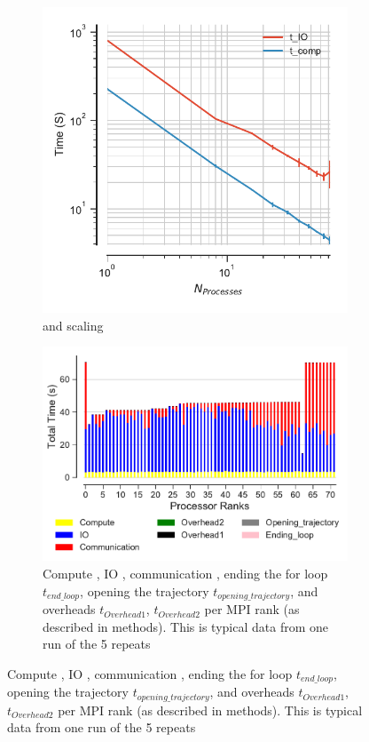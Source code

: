 \begin{figure}[ht!]
\begin{subfigure}{.4\textwidth}
  \includegraphics[width=\linewidth]{figures/main-RMSD-time_comp_IO_comparison.pdf}
\caption{\tcomp and \tIO scaling}
\label{fig:ScalingComputeIO}
\end{subfigure}
\hfill
\begin{subfigure} {.5\textwidth}
  \includegraphics[width=\linewidth]{figures/main-RMSD-BarPlot-rank-comparison_72_4.pdf}
  \caption{Compute \tcomp, IO \tIO, communication \tcomm, ending the for loop $t_{end\_loop}$,
  opening the trajectory $t_{opening\_trajectory}$, and overheads $t_{Overhead1}$,  $t_{Overhead2}$ per MPI rank (as described in methods).
  This is typical data from one run of the 5 repeats}
  \label{fig:MPIranks}
\end{subfigure}


\end{figure}
